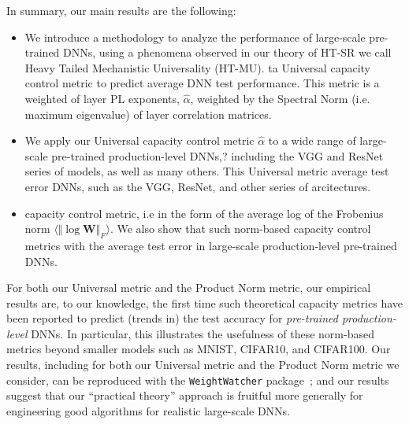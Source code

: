 In summary, our main results are the following:
\begin{itemize}
\item
We introduce a  methodology to analyze the performance of large-scale pre-trained DNNs,
using a phenomena observed in our theory of HT-SR we call Heavy Tailed Mechanistic Universality (HT-MU).
 ta Universal capacity control metric to predict average DNN test performance.
This metric is a weighted  of layer PL exponents, $\hat{\alpha}$, weighted by the Spectral Norm
(i.e. maximum eigenvalue) of layer correlation matrices. 
\item
We apply our Universal capacity control metric $\hat{\alpha}$ to a wide range of large-scale pre-trained production-level DNNs,?
 including the VGG and ResNet series of models, as well as many others.
This Universal metric  average test error  DNNs,
such as the VGG, ResNet, and other series of arcitectures.
\item
{} capacity control metric, i.e
in the form of the average log of the Frobenius norm $\langle\Vert\log\mathbf{W}\Vert_{F}\rangle$.
We also show that
such norm-based capacity control metrics  with the average test error in large-scale production-level pre-trained DNNs.
\end{itemize}



For both our Universal metric and the Product Norm metric, our empirical results are, to our knowledge, the first time such theoretical capacity metrics have been reported to predict (trends in) the test accuracy for \emph{pre-trained production-level} DNNs.
In particular, this illustrates the usefulness of these norm-based metrics beyond smaller models such as MNIST, CIFAR10, and CIFAR100. 
Our 
results, including for both our Universal metric and the Product Norm metric we consider, can be reproduced with the \texttt{WeightWatcher} package~\cite{weightwatcher_pagkage}; and our
results suggest that our ``practical theory'' approach is fruitful more generally for engineering good algorithms for realistic large-scale DNNs.



